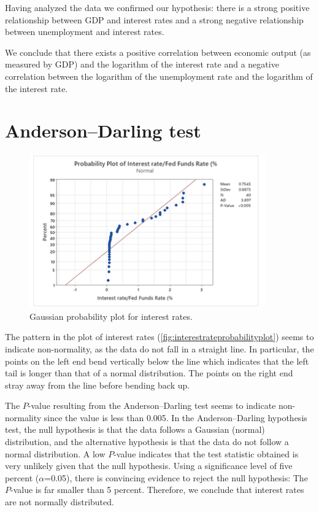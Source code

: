 \documentclass[12pt]{article}
\begin{document}
Having analyzed the data we confirmed our hypothesis: there is a strong positive relationship between GDP and interest rates and a strong negative relationship between unemployment and interest rates.

We conclude that there exists a positive correlation between economic output (as measured by GDP) and the logarithm of the interest rate and a negative correlation between the logarithm of the unemployment rate and the logarithm of the interest rate.

\section{Anderson--Darling test}
\begin{figure}[h]
\begin{center}
\includegraphics[width=4in]{images/interest-rate-probability-plot.png}
\end{center}
\caption{Gaussian probability plot for interest rates. \label{fig:interestrateprobabilityplot}}
\end{figure}
The pattern in the plot of interest rates (\autoref{fig:interestrateprobabilityplot}) seems to indicate non-normality, as the data do not fall in a straight line. In particular, the points on the left end bend vertically below the line which indicates that the left tail is longer than that of a normal distribution. The points on the right end stray away from the line before bending back up.

The $P$-value resulting from the Anderson--Darling test seems to indicate non-normality since the value is less than 0.005. In the Anderson--Darling hypothesis test, the null hypothesis is that the data follows a Gaussian (normal) distribution, and the alternative hypothesis is that the data do not follow a normal distribution. A low $P$-value indicates that the test statistic obtained is very unlikely given that the null hypothesis. Using a significance level of five percent ($\alpha$=0.05), there is convincing evidence to reject the null hypothesis: The $P$-value is far smaller than 5 percent. Therefore, we conclude that interest rates are not normally distributed.
\end{document}
